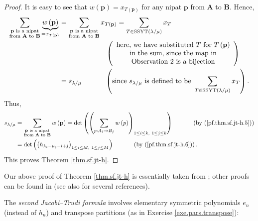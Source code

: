 \begin{proof}
It is easy to see that $w\left(  \mathbf{p}\right)  =x_{T\left(
\mathbf{p}\right)  }$ for any nipat $\mathbf{p}$ from $\mathbf{A}$ to
$\mathbf{B}$. Hence,%
\begin{align*}
\sum_{\substack{\mathbf{p}\text{ is a nipat}\\\text{from }\mathbf{A}\text{ to
}\mathbf{B}}}\underbrace{w\left(  \mathbf{p}\right)  }_{=x_{T\left(
\mathbf{p}\right)  }}  &  =\sum_{\substack{\mathbf{p}\text{ is a
nipat}\\\text{from }\mathbf{A}\text{ to }\mathbf{B}}}x_{T\left(
\mathbf{p}\right)  }=\sum_{T\in\operatorname*{SSYT}\left(  \lambda/\mu\right)
}x_{T}\\
&  \ \ \ \ \ \ \ \ \ \ \ \ \ \ \ \ \ \ \ \ \left(
\begin{array}
[c]{c}%
\text{here, we have substituted }T\text{ for }T\left(  \mathbf{p}\right) \\
\text{in the sum, since the map in}\\
\text{Observation 2 is a bijection}%
\end{array}
\right) \\
&  =s_{\lambda/\mu}\ \ \ \ \ \ \ \ \ \ \left(  \text{since }s_{\lambda/\mu
}\text{ is defined to be }\sum_{T\in\operatorname*{SSYT}\left(  \lambda
/\mu\right)  }x_{T}\right)  .
\end{align*}
Thus,%
\begin{align*}
s_{\lambda/\mu}  &  =\sum_{\substack{\mathbf{p}\text{ is a nipat}\\\text{from
}\mathbf{A}\text{ to }\mathbf{B}}}w\left(  \mathbf{p}\right)  =\det\left(
\left(  \sum_{p:A_{i}\rightarrow B_{j}}w\left(  p\right)  \right)  _{1\leq
i\leq k,\ 1\leq j\leq k}\right)  \ \ \ \ \ \ \ \ \ \ \left(  \text{by
(\ref{pf.thm.sf.jt-h.5})}\right) \\
&  =\det\left(  \left(  h_{\lambda_{i}-\mu_{j}-i+j}\right)  _{1\leq i\leq
M,\ 1\leq j\leq M}\right)  \ \ \ \ \ \ \ \ \ \ \left(  \text{by
(\ref{pf.thm.sf.jt-h.6})}\right)  .
\end{align*}
This proves Theorem \ref{thm.sf.jt-h}.
\end{proof}

Our above proof of Theorem \ref{thm.sf.jt-h} is essentially taken from
\cite[First proof of Theorem 7.16.1]{Stanley-EC2}; other proofs can be found
in \cite[Exercise 2.7.13]{GriRei} (see also \cite[paragraph after Theorem
2.4.6]{GriRei} for several references).

The \emph{second Jacobi--Trudi formula} involves elementary symmetric
polynomials $e_{n}$ (instead of $h_{n}$) and transpose partitions (as in
Exercise \ref{exe.pars.transpose}):

